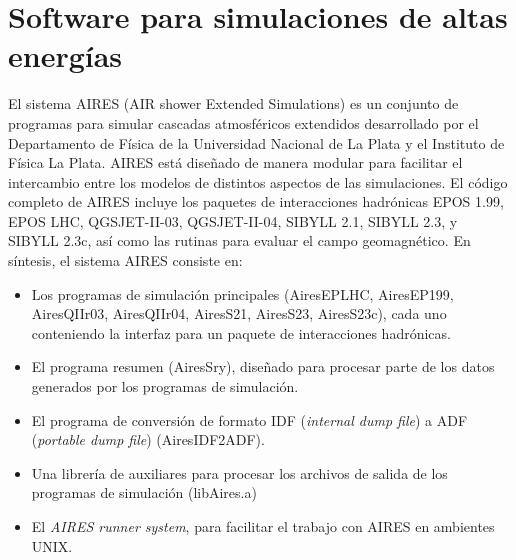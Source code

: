 \section{Software para simulaciones de altas energías}
El sistema AIRES (AIR shower Extended Simulations) es un conjunto de programas para simular cascadas atmosféricos extendidos desarrollado por el Departamento de Física de la Universidad Nacional de La Plata y el Instituto de Física La Plata. AIRES está diseñado de manera modular para facilitar el intercambio entre los modelos de distintos aspectos de las simulaciones. El código completo de AIRES incluye los paquetes de interacciones hadrónicas EPOS 1.99, EPOS LHC, QGSJET-II-03, QGSJET-II-04, SIBYLL 2.1, SIBYLL 2.3, y SIBYLL 2.3c, así como las rutinas para evaluar el campo geomagnético. En síntesis, el sistema AIRES consiste en:
	\begin{itemize}
	\item Los programas de simulación principales (AiresEPLHC, AiresEP199, AiresQIIr03, AiresQIIr04, AiresS21, AiresS23, AiresS23c), cada uno conteniendo la interfaz para un paquete de interacciones hadrónicas.
	\item El programa resumen (AiresSry), diseñado para procesar parte de los datos generados por los programas de simulación.
	\item El programa de conversión de formato IDF (\textit{internal dump file}) a ADF (\textit{portable dump file}) (AiresIDF2ADF).
	\item Una librería de auxiliares para procesar los archivos de salida de los programas de simulación (libAires.a)
	\item El \textit{AIRES runner system}, para facilitar el trabajo con AIRES en ambientes UNIX. 
	\end{itemize}
	
